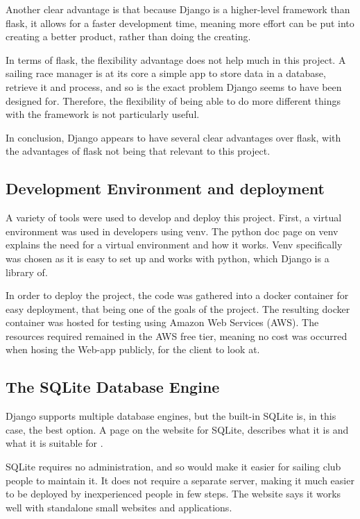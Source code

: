 \documentclass{l4proj}
\begin{document}
Another clear advantage is that because Django is a higher-level framework than flask, it allows for a faster development time, meaning more effort can be put into creating a better product, rather than doing the creating.

In terms of flask, the flexibility advantage does not help much in this project. A sailing race manager is at its core a simple app to store data in a database, retrieve it and process, and so is the exact problem Django seems to have been designed for. Therefore, the flexibility of being able to do more different things with the framework is not particularly useful.

In conclusion, Django appears to have several clear advantages over flask, with the advantages of flask not being that relevant to this project. 

\subsection{Development Environment and deployment}

A variety of tools were used to develop and deploy this project. First, a virtual environment was used in developers using venv. The python doc page on venv \citep{venv} explains the need for a virtual environment and how it works. Venv specifically was chosen as it is easy to set up and works with python, which Django is a library of.

In order to deploy the project, the code was gathered into a docker container for easy deployment, that being one of the goals of the project. The resulting docker container was hosted for testing using Amazon Web Services (AWS). The resources required remained in the AWS free tier, meaning no cost was occurred when hosing the Web-app publicly, for the client to look at.

\subsection{The SQLite Database Engine}
Django supports multiple database engines, but the built-in SQLite is, in this case, the best option. A page on the website for SQLite, describes what it is and what it is suitable for \citep{SQL}.

SQLite requires no administration, and so would make it easier for sailing club people to maintain it. It does not require a separate server, making it much easier to be deployed by inexperienced people in few steps. The website says it works well with standalone small websites and applications.
\end{document}
